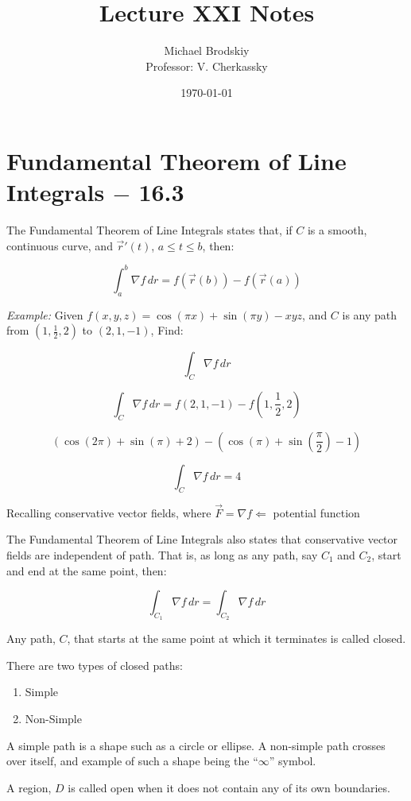 \documentclass[12pt]{article}
\title{Lecture XXI Notes}
\date{\today}
\author{Michael Brodskiy\\ \small Professor: V. Cherkassky}
\begin{document}
\maketitle

\section{Fundamental Theorem of Line Integrals $-$ 16.3}

The Fundamental Theorem of Line Integrals states that, if $C$ is a smooth, continuous curve, and $\overrightarrow{r}'(t)$, $a\leq t\leq b$, then:

$$\int_a^b \nabla f\,dr=f(\overrightarrow{r}(b))-f(\overrightarrow{r}(a))$$

\textit{Example:} Given $f(x,y,z)=\cos(\pi x)+\sin(\pi y)-xyz$, and $C$ is any path from $(1,\frac{1}{2}, 2)$ to $(2,1,-1)$, Find:

$$\int_C \nabla f\,dr$$

$$\int_C \nabla f\,dr=f(2,1,-1)-f\left(1,\frac{1}{2},2\right)$$

$$(\cos(2\pi)+\sin(\pi)+2)-(\cos(\pi)+\sin\left(\frac{\pi}{2}\right)-1)$$

$$\int_C \nabla f\,dr=4$$

Recalling conservative vector fields, where $\overrightarrow{F}=\nabla f \Leftarrow$ potential function  

The Fundamental Theorem of Line Integrals also states that conservative vector fields are independent of path. That is, as long as any path, say $C_1$ and $C_2$, start and end at the same point, then:

$$\int_{C_1} \nabla f\,dr=\int_{C_2} \nabla f\,dr$$

Any path, $C$, that starts at the same point at which it terminates is called closed.

There are two types of closed paths:

\begin{enumerate}

  \item Simple

  \item Non-Simple

\end{enumerate}

A simple path is a shape such as a circle or ellipse. A non-simple path crosses over itself, and example of such a shape being the ``$\infty$'' symbol.

A region, $D$ is called open when it does not contain any of its own boundaries.
\end{document}
